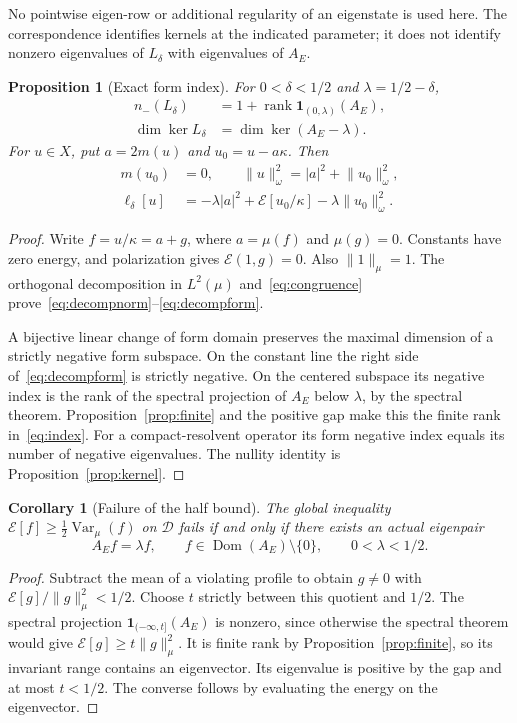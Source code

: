 \documentclass[11pt,a4paper]{article}
\numberwithin{equation}{section}
\newtheorem{proposition}[theorem]{Proposition}
\newtheorem{corollary}[theorem]{Corollary}
\theoremstyle{remark}
\newcommand{\E}{\mathcal E}
\newcommand{\D}{\mathcal D}
\newcommand{\dom}{\operatorname{Dom}}
\newcommand{\Var}{\operatorname{Var}}
\newcommand{\rank}{\operatorname{rank}}
\newcommand{\norm}[1]{\lVert #1\rVert}
\newcommand{\one}{\mathbf 1}
\begin{document}
No pointwise eigen-row or additional regularity of an eigenstate is used here. The correspondence identifies kernels at the indicated parameter; it does not identify nonzero eigenvalues of $L_\delta$ with eigenvalues of $A_E$.

\begin{proposition}[Exact form index]\label{prop:index}
For $0<\delta<1/2$ and $\lambda=1/2-\delta$,
\begin{align}
 n_-(L_\delta)&=1+\rank\one_{(0,\lambda)}(A_E),\label{eq:index}\\
 \dim\ker L_\delta&=\dim\ker(A_E-\lambda).\label{eq:nullity}
\end{align}
For $u\in X$, put $a=2m(u)$ and $u_0=u-a\kappa$. Then
\begin{align}
 m(u_0)&=0,\qquad
 \norm{u}_\omega^2=|a|^2+\norm{u_0}_\omega^2,\label{eq:decompnorm}\\
 \ell_\delta[u]&=-\lambda|a|^2+
              \E[u_0/\kappa]-\lambda\norm{u_0}_\omega^2.\label{eq:decompform}
\end{align}
\end{proposition}
\begin{proof}
Write $f=u/\kappa=a+g$, where $a=\mu(f)$ and $\mu(g)=0$. Constants have zero energy, and polarization gives $\E(1,g)=0$. Also $\norm{1}_\mu=1$. The orthogonal decomposition in $L^2(\mu)$ and~\eqref{eq:congruence} prove~\eqref{eq:decompnorm}--\eqref{eq:decompform}.

A bijective linear change of form domain preserves the maximal dimension of a strictly negative form subspace. On the constant line the right side of~\eqref{eq:decompform} is strictly negative. On the centered subspace its negative index is the rank of the spectral projection of $A_E$ below $\lambda$, by the spectral theorem. Proposition~\ref{prop:finite} and the positive gap make this the finite rank in~\eqref{eq:index}. For a compact-resolvent operator its form negative index equals its number of negative eigenvalues. The nullity identity is Proposition~\ref{prop:kernel}.
\end{proof}

\begin{corollary}[Failure of the half bound]\label{cor:failure}
The global inequality $\E[f]\ge\tfrac12\Var_\mu(f)$ on $\D$ fails if and only if there exists an actual eigenpair
\[
 A_Ef=\lambda f,\qquad f\in\dom(A_E)\setminus\{0\},\qquad0<\lambda<1/2.
\]
\end{corollary}
\begin{proof}
Subtract the mean of a violating profile to obtain $g\ne0$ with $\E[g]/\norm{g}_\mu^2<1/2$. Choose $t$ strictly between this quotient and $1/2$. The spectral projection $\one_{(-\infty,t]}(A_E)$ is nonzero, since otherwise the spectral theorem would give $\E[g]\ge t\norm{g}_\mu^2$. It is finite rank by Proposition~\ref{prop:finite}, so its invariant range contains an eigenvector. Its eigenvalue is positive by the gap and at most $t<1/2$. The converse follows by evaluating the energy on the eigenvector.
\end{proof}
\end{document}
